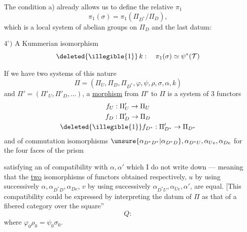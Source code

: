 
The condition a) already allows us to define the
relative $\pi_1$
\[
\pi_1(\sigma)
 = \pi_1(\Pi_{D^*}/\Pi_D),
\]
which is a local system of  abelian groups on $\Pi_D$
and the last datum: 

$4^\circ)$ A Kummerian isomorphism
\[
\deleted{\illegible{1}}\,k:\quad
\pi_1(\sigma)\simeq
\psi^*(\mathcal T)
\]

If we have two systems of this nature
\[
\Pi=(\Pi_U,\Pi_D,\Pi_{D^*},\varphi,\psi,\rho,\sigma,\alpha,k)
\]
and $\Pi'=(\Pi'_U,\Pi'_D,\ldots)$, a \uline{morphism}
from $\Pi'$ to $\Pi$ is a system of $3$ functors
\[
\begin{gathered}
f_U:\Pi'_U\to\Pi_U\\
f_D:\Pi'_D\to\Pi_D\\
\deleted{\illegible{1}}f_{D^*}:\Pi'_{D^*}\to\Pi_{D^*}
\end{gathered}
\]
and of 
commutation isomorphisms
$\unsure{\alpha_{D^*D^*}|\alpha_{D^*D}},\alpha_{D^*U},\alpha_{Ue},\alpha_{De}$
for the four faces of the prism


satisfying an  of compatibility with $\alpha,\alpha'$ which I do not write down
--- meaning that the \uline{two}
 isomorphisms  of functors
obtained respectively, $u$ by using successively
$\alpha,\alpha_{D^*D},\alpha_{De}$,  $v$ by
using successively $\alpha_{D^*U},\alpha_{Ue},\alpha'$, are equal.
[This compatibility could be expressed by interpreting the datum
of $\Pi$ as that of a fibered
category \inserted{$\Pi$} over the 
 square''
\[
Q:
\]
where $\varphi_0\rho_0=\psi_0\sigma_0$.

